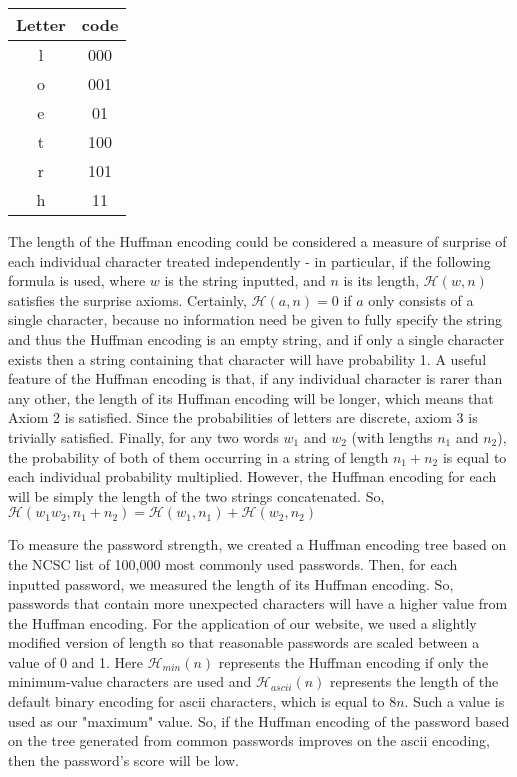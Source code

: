 \documentclass{article}
\begin{document}
{
\centering
\begin{tabular}{c|c}
    \centering
    Letter & code\\
    \hline
    l & 000 \\
    o & 001 \\
    e & 01 \\
    t & 100 \\
    r & 101 \\
    h & 11
\end{tabular}\par
}

The length of the Huffman encoding could be considered a measure of surprise of each individual character treated independently - in particular, if the following formula is used, where $w$ is the string inputted, and $n$ is its length, $\mathcal{H}(w,n)$ satisfies the surprise axioms. Certainly, $\mathcal{H}(a,n)=0$ if $a$ only consists of a single character, because no information need be given to fully specify the string and thus the Huffman encoding is an empty string, and if only a single character exists then a string containing that character will have probability 1. A useful feature of the Huffman encoding is that, if any individual character is rarer than any other, the length of its Huffman encoding will be longer, which means that Axiom 2 is satisfied. Since the probabilities of letters are discrete, axiom 3 is trivially satisfied. Finally, for any two words $w_1$ and $w_2$ (with lengths $n_1$ and $n_2$), the probability of both of them occurring in a string of length $n_1+n_2$ is equal to each individual probability multiplied. However, the Huffman encoding for each will be simply the length of the two strings concatenated. So, $\mathcal{H}(w_1w_2,n_1+n_2)=\mathcal{H}(w_1,n_1)+\mathcal{H}(w_2,n_2)$

To measure the password strength, we created a Huffman encoding tree based on the NCSC list of 100,000 most commonly used passwords. Then, for each inputted password, we measured the length of its Huffman encoding. So, passwords that contain more unexpected characters will have a higher value from the Huffman encoding.
For the application of our website, we used a slightly modified version of length so that reasonable passwords are scaled between a value of 0 and 1. Here $\mathcal{H}_{min}(n)$ represents the Huffman encoding if only the minimum-value characters are used and $\mathcal{H}_{ascii}(n)$ represents the length of the default binary encoding for ascii characters, which is equal to $8n$. Such a value is used as our "maximum" value. So, if the Huffman encoding of the password based on the tree generated from common passwords improves on the ascii encoding, then the password's score will be low.
\end{document}
